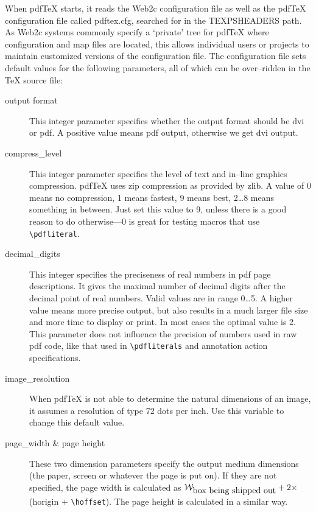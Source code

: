\documentclass{article}
\begin{document}

When pdf\TeX{} starts, it reads the Web2c configuration file as well
as the pdf\TeX{} configuration file called pdftex.cfg, searched for in
the TEXPSHEADERS path. As Web2c systems commonly specify a `private' tree
for pdf\TeX{} where configuration and map files are located, this allows
individual users or projects to maintain customized versions of the
configuration file. The configuration file sets default values for the
following parameters, all of which can be over--ridden in the \TeX{}
source file:

\begin{description}
\item[output format] This integer parameter specifies whether the
output format should be dvi or pdf. A positive value means pdf output,
otherwise we get dvi output.

\item[compress\_level] This integer parameter specifies the level of
text and in--line graphics compression. pdf\TeX{} uses zip compression
as provided by zlib. A value of 0 means no compression, 1 means fastest,
9 means best, 2\dots8 means something in between. Just set this value
to 9, unless there is a good reason to do otherwise---0 is great for
testing macros that use \verb+\pdfliteral+.

\item[decimal\_digits] This integer specifies the preciseness of real
numbers in pdf page descriptions.
It gives the maximal number of decimal digits after the decimal point
of real numbers. Valid values are in range 0\dots5. A higher value
means more precise output, but also results in a much larger file
size and more time to display or print. In most cases the optimal value is
2. This parameter does not influence the precision of numbers used in
raw pdf code, like that used in \verb+\pdfliterals+ and annotation
action specifications.

\item[image\_resolution] When pdf\TeX{} is not able to determine the
natural dimensions of an image, it assumes a resolution of type
72 dots per inch. Use this variable to change this default value.

\item[page\_width \& page height] These two dimension parameters specify
the output medium dimensions (the paper, screen or whatever the page
is put on). If they are not specified, the page width is calculated as
$\mathcal{W}_{\mbox{\small box being shipped out}} + 2\times$
(horigin $+$ \verb+\hoffset+). The page height is calculated in a
similar way.


\end{description}
\end{document}
